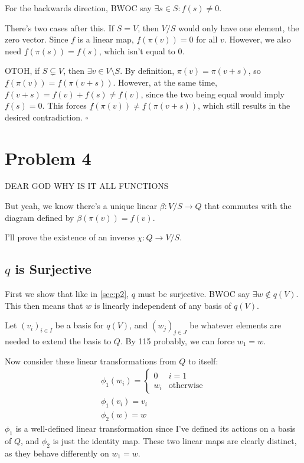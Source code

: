 \documentclass[12pt]{article}
\begin{document}
For the backwards direction, BWOC say $\exists s \in S: f(s) \ne 0$.

There's two cases after this.
If $S=V$, then $V/S$ would only have one element, the zero vector.
Since $\underline{f}$ is a linear map, $\underline{f}(\pi(v))=0$ for all $v$.
However, we also need $\underline{f}(\pi(s))=f(s)$, which isn't equal to $0$.

OTOH, if $S \subsetneq V$, then $\exists v \in V \setminus S$.
By definition, $\pi(v)=\pi(v + s)$, so $\underline{f}(\pi(v))=\underline{f}(\pi(v+s))$.
However, at the same time, $f(v+s)=f(v)+f(s) \ne f(v)$, since the two
being equal would imply $f(s)=0$.
This forces $\underline{f}(\pi(v)) \ne \underline{f}(\pi(v+s))$,
which still results in the desired contradiction. $\square$

\pagebreak

\section{Problem 4}

DEAR GOD WHY IS IT ALL FUNCTIONS

But yeah, we know there's a unique linear $\beta: V/S \to Q$ that commutes with the diagram
defined by $\beta(\pi(v))=f(v)$.

I'll prove the existence of an inverse $\chi: Q \to V/S$.

\subsection{\texorpdfstring{$q$}{q} is Surjective}

First we show that like in \ref{sec:p2}, $q$ must be surjective.
BWOC say $\exists w \notin q(V)$.
This then means that $w$ is linearly independent of any basis of $q(V)$.

Let $(v_i)_{i \in I}$ be a basis for $q(V)$, and $(w_j)_{j \in J}$
be whatever elements are needed to extend the basis to $Q$.
By 115 probably, we can force $w_1=w$.

Now consider these linear transformations from $Q$ to itself:
\begin{gather*}
  \phi_1(w_i)=\begin{cases}
    0   & i=1              \\
    w_i & \text{otherwise}
  \end{cases} \\
  \phi_1(v_i)=v_i \\
  \phi_2(w)=w
\end{gather*}
$\phi_1$ is a well-defined linear transformation since I've defined its actions on a basis of $Q$,
and $\phi_2$ is just the identity map.
These two linear maps are clearly distinct,
as they behave differently on $w_1=w$.
\end{document}
